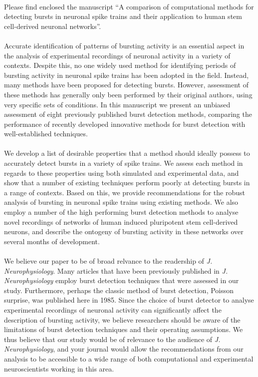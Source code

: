 \documentclass[usetimesfont,usebwarms,a4paper,nofold]{damtplet}
\begin{document}
\begin{letter}{}{
		
		\\
		\\\\
		\\
		\\
		\\
		 }
%
%
{

 Please find enclosed the manuscript ``A comparison of computational methods for detecting bursts in neuronal spike trains and their application to human stem cell-derived neuronal networks''. 
 \\ \\Accurate identification of patterns of bursting activity is an essential aspect in the analysis of experimental recordings of neuronal activity in a variety of contexts. Despite this, no one widely used method for identifying periods of bursting activity in neuronal spike trains has been adopted in the field. Instead, many methods have been proposed for detecting bursts. However, assessment of these methods has generally only been performed by their original authors, using very specific sets of conditions. In this manuscript we present an unbiased assessment of eight previously published burst detection methods, comparing the performance of recently developed innovative methods for burst detection with well-established techniques.
 \\ \\We develop a list of desirable properties that a method should ideally possess to accurately detect bursts in a variety of spike trains. We assess each method in regards to these properties using both simulated and experimental data, and show that a number of existing techniques perform poorly at detecting bursts in a range of contexts. Based on this, we provide recommendations for the robust analysis of bursting in neuronal spike trains using existing methods. We also employ a number of the high performing burst detection methods to analyse novel recordings of networks of human induced pluripotent stem cell-derived neurons, and describe the ontogeny of bursting activity in these networks over several months of development.
  \\ \\We believe our paper to be of broad relvance to the readership of \textit{J.  Neurophysiology}.  Many articles that have been previously published in \textit{J. Neurophysiology} employ burst detection techniques that were assessed in our study. Furthermore, perhaps the  classic method of burst detection, Poisson surprise, was published here in 1985. Since the choice of burst detector to analyse experimental recordings of neuronal activity can significantly affect the description of bursting activity, we believe researchers should be aware of the limitations of burst detection techniques and their operating assumptions. We thus believe that our study would be of relevance to the audience of \textit{J. Neurophysiology}, and your journal would allow the recommendations from our analysis to be accessible to a wide range of both computational and experimental neuroscientists working in this area.
}
\end{letter}
\end{document}
